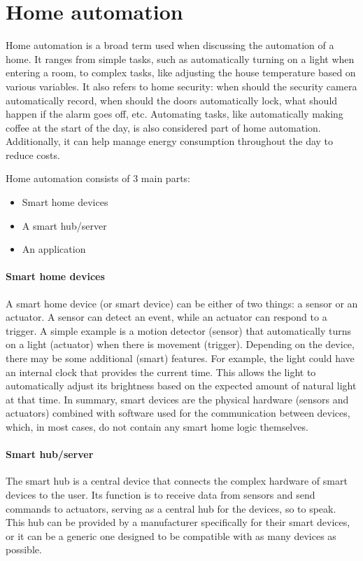 \documentclass[11pt,a4paper]{report}
\begin{document}
\section{Home automation}
Home automation is a broad term used when discussing the automation of a home. It ranges from simple tasks, such as automatically turning on a light when entering a room, to complex tasks, like adjusting the house temperature based on various variables. It also refers to home security: when should the security camera automatically record, when should the doors automatically lock, what should happen if the alarm goes off, etc. Automating tasks, like automatically making coffee at the start of the day, is also considered part of home automation. Additionally, it can help manage energy consumption throughout the day to reduce costs.

Home automation consists of 3 main parts:
\begin{itemize}
    \item Smart home devices
    \item A smart hub/server
    \item An application
\end{itemize}

\paragraph{Smart home devices}
A smart home device (or smart device) can be either of two things: a sensor or an actuator. A sensor can detect an event, while an actuator can respond to a trigger. A simple example is a motion detector (sensor) that automatically turns on a light (actuator) when there is movement (trigger). Depending on the device, there may be some additional (smart) features. For example, the light could have an internal clock that provides the current time. This allows the light to automatically adjust its brightness based on the expected amount of natural light at that time. In summary, smart devices are the physical hardware (sensors and actuators) combined with software used for the communication between devices, which, in most cases, do not contain any smart home logic themselves.

\paragraph{Smart hub/server}
The smart hub is a central device that connects the complex hardware of smart devices to the user. Its function is to receive data from sensors and send commands to actuators, serving as a central hub for the devices, so to speak. This hub can be provided by a manufacturer specifically for their smart devices, or it can be a generic one designed to be compatible with as many devices as possible.
\end{document}
